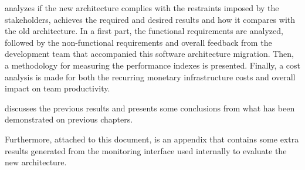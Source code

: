  analyzes if the new architecture complies with the restraints imposed by the stakeholders, achieves the required and desired results and how it compares with the old architecture. In a first part, the functional requirements are analyzed, followed by the non-functional requirements and overall feedback from the development team that accompanied this software architecture migration. Then, a methodology for measuring the performance indexes is presented. Finally, a cost analysis is made for both the recurring monetary infrastructure costs and overall impact on team productivity.

 discusses the previous results and presents some conclusions from what has been demonstrated on previous chapters.

Furthermore, attached to this document, is an appendix that contains some extra results generated from the monitoring interface used internally to evaluate the new architecture.











